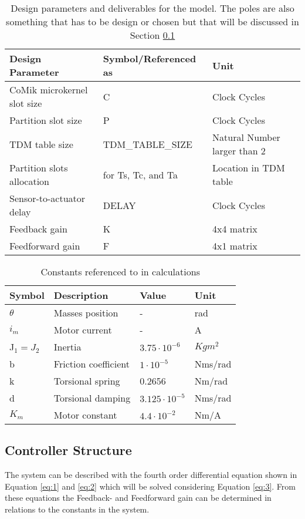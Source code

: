 \begin{table}[h!]
	\centering
	\caption{Design parameters and deliverables for the model. The poles are also something that has to be design or chosen but that will be discussed in Section \ref{sec:controllerstructure}}
	\begin{tabular}{lll}
		\toprule
		Design Parameter & Symbol/Referenced as &Unit\\
		\midrule
		CoMik microkernel slot size& C & Clock Cycles \\
		Partition slot size& P & Clock Cycles\\
		TDM table size& TDM\_TABLE\_SIZE & Natural Number larger than 2\\
		Partition slots allocation	& for Ts, Tc, and Ta & Location in TDM table \\
		Sensor-to-actuator	delay& DELAY & Clock Cycles	\\
		Feedback gain& K & 4x4 matrix \\
		Feedforward gain& F & 4x1 matrix \\
		\midrule		
	\end{tabular}
	\label{tab:design}
\end{table}

\begin{table}[htbp]
	\centering
	\caption{Constants referenced to in calculations}
	\begin{tabular}{llll}
		\toprule
		Symbol & Description & Value & Unit\\ 
		\midrule
		$\theta$ & Masses position  & -&rad \\ 
		$i_m$ & Motor current  & - &A \\ 
		J$_1 = J_2$ & Inertia  & $3.75\cdot10^{-6}$&$Kgm^2$  \\ 
		b & Friction  coefficient   &$ 1\cdot10^{-5} $&Nms/rad\\ 
		k & Torsional spring  & 0.2656 &Nm/rad\\
		d & Torsional damping  & $3.125\cdot10^{-5}$&Nms/rad \\ 
		$K_m$ & Motor constant  & $4.4\cdot10^{-2}$&Nm/A  \\ 
		\midrule
	\end{tabular}
	\label{}
\end{table}

 

\subsection{Controller Structure}
 \label{sec:controllerstructure}
The system can be described with the fourth order differential equation shown in Equation \ref{eq:1} and \ref{eq:2} which will be solved considering Equation \ref{eq:3}. From these equations the Feedback- and Feedforward gain can be determined in relations to the constants in the system.

